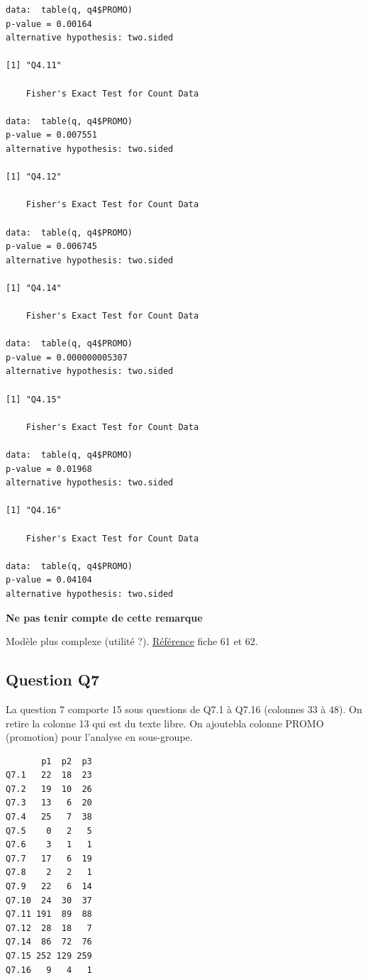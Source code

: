 \documentclass[]{article}
\newenvironment{Shaded}{\begin{snugshade}}{\end{snugshade}}
\newcommand{\CommentTok}[1]{\textcolor[rgb]{0.56,0.35,0.01}{\textit{{#1}}}}
\begin{document}
\begin{verbatim}
data:  table(q, q4$PROMO)
p-value = 0.00164
alternative hypothesis: two.sided

[1] "Q4.11"

    Fisher's Exact Test for Count Data

data:  table(q, q4$PROMO)
p-value = 0.007551
alternative hypothesis: two.sided

[1] "Q4.12"

    Fisher's Exact Test for Count Data

data:  table(q, q4$PROMO)
p-value = 0.006745
alternative hypothesis: two.sided

[1] "Q4.14"

    Fisher's Exact Test for Count Data

data:  table(q, q4$PROMO)
p-value = 0.000000005307
alternative hypothesis: two.sided

[1] "Q4.15"

    Fisher's Exact Test for Count Data

data:  table(q, q4$PROMO)
p-value = 0.01968
alternative hypothesis: two.sided

[1] "Q4.16"

    Fisher's Exact Test for Count Data

data:  table(q, q4$PROMO)
p-value = 0.04104
alternative hypothesis: two.sided
\end{verbatim}

\textbf{Ne pas tenir compte de cette remarque}

Modèle plus complexe (utilité ?).
\href{http://cran.r-project.org/doc/contrib/Herve-Aide-memoire-statistique.pdf}{Référence}
fiche 61 et 62.

\begin{Shaded}
\end{Shaded}

\subsection{Question Q7}\label{question-q7}

La question 7 comporte 15 sous questions de Q7.1 à Q7.16 (colonnes 33 à
48). On retire la colonne 13 qui est du texte libre. On ajoutebla
colonne PROMO (promotion) pour l'analyse en sous-groupe.

\begin{verbatim}
       p1  p2  p3
Q7.1   22  18  23
Q7.2   19  10  26
Q7.3   13   6  20
Q7.4   25   7  38
Q7.5    0   2   5
Q7.6    3   1   1
Q7.7   17   6  19
Q7.8    2   2   1
Q7.9   22   6  14
Q7.10  24  30  37
Q7.11 191  89  88
Q7.12  28  18   7
Q7.14  86  72  76
Q7.15 252 129 259
Q7.16   9   4   1
\end{verbatim}
\end{document}
